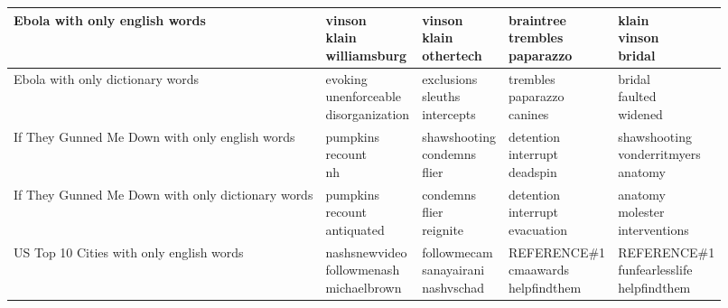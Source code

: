 \documentclass[11pt, oneside]{article}
\makeatletter
\newcommand{\specialcell}[2][c]{%
  \begin{tabular}[#1]{@{}c@{}}#2\end{tabular}}
\makeatother
\begin{document}
\begin{enumerate}
\begin{tabularx}{\textwidth}{X|l|l|l|l}
\hline Ebola with only english words & 
\specialcell{vinson\\klain\\williamsburg} & 
\specialcell{vinson\\klain\\othertech} & 
\specialcell{braintree\\trembles\\paparazzo} & 
\specialcell{klain\\vinson\\bridal} \\ 

\hline Ebola with only dictionary words & 
\specialcell{evoking\\unenforceable\\disorganization} & 
\specialcell{exclusions\\sleuths\\intercepts} & 
\specialcell{trembles\\paparazzo\\canines} &
 \specialcell{bridal\\faulted\\widened}  \\ 

\hline If They Gunned Me Down with only english words & 
\specialcell{pumpkins\\recount\\nh} & 
\specialcell{shawshooting\\condemns\\flier} & 
\specialcell{detention\\interrupt\\deadspin} & 
\specialcell{shawshooting\\vonderritmyers\\anatomy} \\ 

\hline If They Gunned Me Down with only dictionary words & 
\specialcell{pumpkins\\recount\\antiquated} & 
\specialcell{condemns\\flier\\reignite} & 
\specialcell{detention\\interrupt\\evacuation} & 
\specialcell{anatomy\\molester\\interventions} \\ 

\hline US Top 10 Cities with only english words & 
\specialcell{nashsnewvideo\\followmenash\\michaelbrown} & 
\specialcell{followmecam\\sanayairani\\nashvschad} & 
\specialcell{REFERENCE\#1\\cmaawards\\helpfindthem} & 
\specialcell{REFERENCE\#1\\funfearlesslife\\helpfindthem} \\ 


\end{tabularx}
\end{enumerate}
\end{document}
